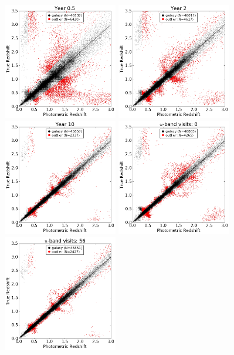 \begin{figure}[h]
\begin{center}
\includegraphics[width=5cm]{figs/photoz/pztz_nyears_p5.png}
\includegraphics[width=5cm]{figs/photoz/pztz_nyears_2.png}
\includegraphics[width=5cm]{figs/photoz/pztz_nyears_10.png}
\includegraphics[width=5cm]{figs/photoz/pztz_uvisits_0.png}
\includegraphics[width=5cm]{figs/photoz/pztz_uvisits_56.png}

\end{center}
\end{figure}
